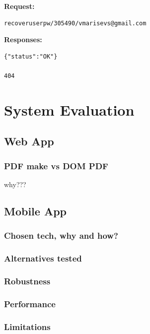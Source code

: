 \textbf{Request:}
\begin{verbatim}
recoveruserpw/305490/vmarisevs@gmail.com
\end{verbatim}

\textbf{Responses:}
\begin{verbatim}
{"status":"OK"}

404
\end{verbatim}

\chapter{System Evaluation}	%
\section{Web App}

	\subsection{PDF make vs DOM PDF}
		why???
	
\section{Mobile App}
\subsection{Chosen tech, why and how?}

\subsection{Alternatives tested}

\subsection{Robustness}

\subsection{Performance}

\subsection{Limitations}
